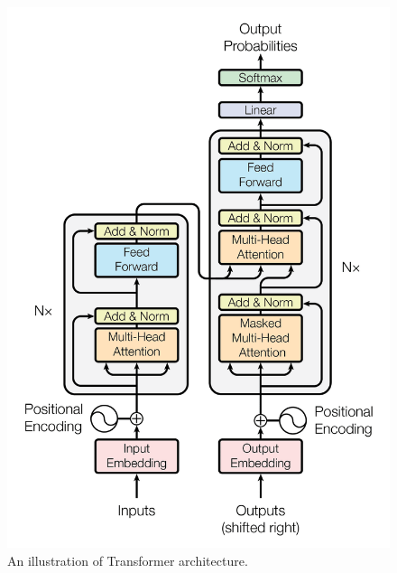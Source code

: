 \begin{figure}[t]
	\centering
	\includegraphics[scale=0.2]{./images/transformer/transformer.png}
	\caption{An illustration of Transformer architecture.}
\end{figure}

